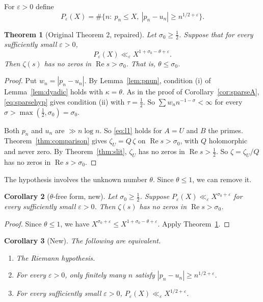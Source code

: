 \documentclass[12pt,letterpaper]{article}
\newtheorem{theorem}{Theorem}[section]
\newtheorem{corollary}[theorem]{Corollary}
\theoremstyle{definition}
\theoremstyle{remark}
\newcommand{\Ree}{\operatorname{Re}}
\newcommand{\eps}{\varepsilon}
\begin{document}
For $\eps>0$ define
\[
P_\eps(X)=\#\{n:\ p_n\le X,\ |p_n-u_n|\ge n^{1/2+\eps}\}.
\]

\begin{theorem}[Original Theorem 2, repaired]\label{thm:sparse}
Let $\sigma_0\ge\frac12$. Suppose that for every sufficiently small
$\eps>0$,
\begin{equation}\label{eq:sparsehyp}
P_\eps(X)\ll_\eps X^{1+\sigma_0-\theta+\eps}.
\end{equation}
Then $\zeta(s)$ has no zeros in $\Ree s>\sigma_0$. That is,
$\theta\le\sigma_0$.
\end{theorem}

\begin{proof}
Put $w_n=|p_n-u_n|$. By Lemma~\ref{lem:pnun}, condition (i) of
Lemma~\ref{lem:dyadic} holds with $\kappa=\theta$. As in the proof of
Corollary~\ref{cor:sparseA}, \eqref{eq:sparsehyp} gives condition (ii) with
$\tau=\frac12$. So $\sum w_nn^{-1-\sigma}<\infty$ for every
$\sigma>\max(\frac12,\sigma_0)=\sigma_0$.

Both $p_n$ and $u_n$ are $\gg n\log n$. So \eqref{eq:l1} holds for $A=U$
and $B$ the primes. Theorem~\ref{thm:comparison} gives
$\zeta_U=Q\,\zeta$ on $\Ree s>\sigma_0$, with $Q$ holomorphic and never zero.
By Theorem~\ref{thm:slit}, $\zeta_U$ has no zeros in $\Ree s>\frac12$. So
$\zeta=\zeta_U/Q$ has no zeros in $\Ree s>\sigma_0$.
\end{proof}

The hypothesis involves the unknown number $\theta$. Since $\theta\le1$, we
can remove it.

\begin{corollary}[$\theta$-free form, new]\label{cor:thetafree}
Let $\sigma_0\ge\frac12$. Suppose $P_\eps(X)\ll_\eps X^{\sigma_0+\eps}$ for
every sufficiently small $\eps>0$. Then $\zeta(s)$ has no zeros in
$\Ree s>\sigma_0$.
\end{corollary}

\begin{proof}
Since $\theta\le1$, we have $X^{\sigma_0+\eps}\le X^{1+\sigma_0-\theta+\eps}$.
Apply Theorem~\ref{thm:sparse}.
\end{proof}

\begin{corollary}[New]\label{cor:RHequiv}
The following are equivalent.
\begin{enumerate}[label=(\alph*)]
\item The Riemann hypothesis.
\item For every $\eps>0$, only finitely many $n$ satisfy
  $|p_n-u_n|\ge n^{1/2+\eps}$.
\item For every sufficiently small $\eps>0$,
  $P_\eps(X)\ll_\eps X^{1/2+\eps}$.
\end{enumerate}
\end{corollary}
\end{document}
